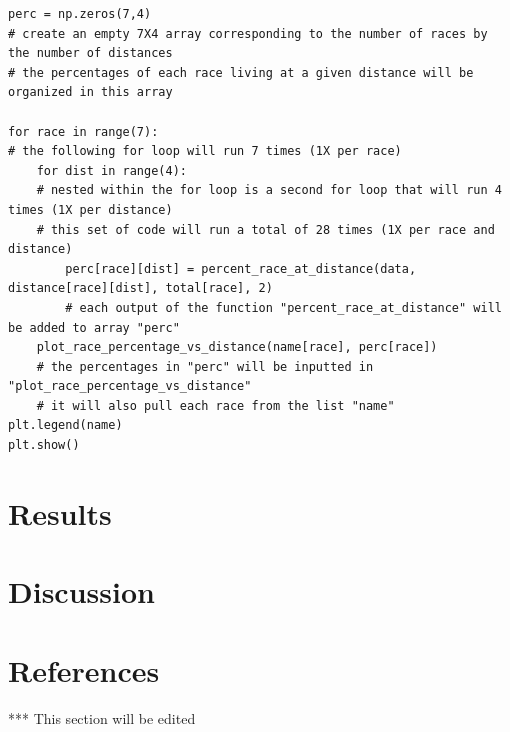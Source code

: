 \documentclass[letterpaper]{article} %
\begin{document}
\lstset{language=Python}
\begin{lstlisting}[frame=single]
perc = np.zeros(7,4)
# create an empty 7X4 array corresponding to the number of races by the number of distances
# the percentages of each race living at a given distance will be organized in this array

for race in range(7):
# the following for loop will run 7 times (1X per race)
    for dist in range(4):
    # nested within the for loop is a second for loop that will run 4 times (1X per distance)
    # this set of code will run a total of 28 times (1X per race and distance)
        perc[race][dist] = percent_race_at_distance(data, distance[race][dist], total[race], 2)
        # each output of the function "percent_race_at_distance" will be added to array "perc"
    plot_race_percentage_vs_distance(name[race], perc[race])
    # the percentages in "perc" will be inputted in "plot_race_percentage_vs_distance"
    # it will also pull each race from the list "name"
plt.legend(name)
plt.show()
\end{lstlisting}

\section{Results}



\section{Discussion}

\newpage
\section{References}

*** This section will be edited 

\end{document}
